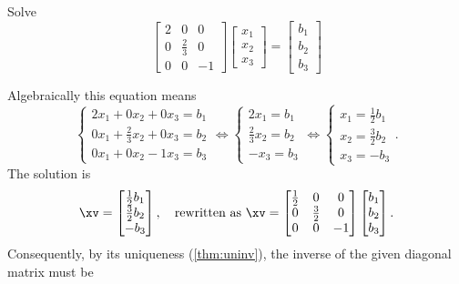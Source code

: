 \begin{example} \label{eg:a3x3inw}
Solve \begin{equation*}
\begin{bmatrix} 2&0&0\\0&\frac23&0\\0&0&-1 \end{bmatrix}
\begin{bmatrix} x_1\\x_2\\x_3 \end{bmatrix}
=\begin{bmatrix} b_1\\b_2\\b_3 \end{bmatrix}
\end{equation*}
\begin{solution}
Algebraically this equation means
\begin{equation*}
\begin{cases} 2x_1+0x_2+0x_3=b_1
\\0x_1+\frac23x_2+0x_3=b_2
\\0x_1+0x_2-1x_3=b_3\end{cases}
\iff
\begin{cases} 2x_1=b_1
\\\frac23x_2=b_2
\\-x_3=b_3\end{cases}
\iff
\begin{cases} x_1=\frac12b_1 \\ x_2=\frac32b_2 \\ x_3=-b_3\end{cases}.
\end{equation*}
The solution is 
\begin{equation*}
\xv=\begin{bmatrix} \frac12b_1 \\ \frac32b_2 \\ -b_3 \end{bmatrix},
\quad\text{rewritten as }
\xv=\begin{bmatrix} \frac12&0&0\\0&\frac32&0\\0&0&-1 \end{bmatrix}
\begin{bmatrix} b_1\\b_2\\b_3 \end{bmatrix}.
\end{equation*}
Consequently, by its uniqueness (\autoref{thm:uninv}), the inverse of the given diagonal matrix must be

\end{solution}
\end{example}
